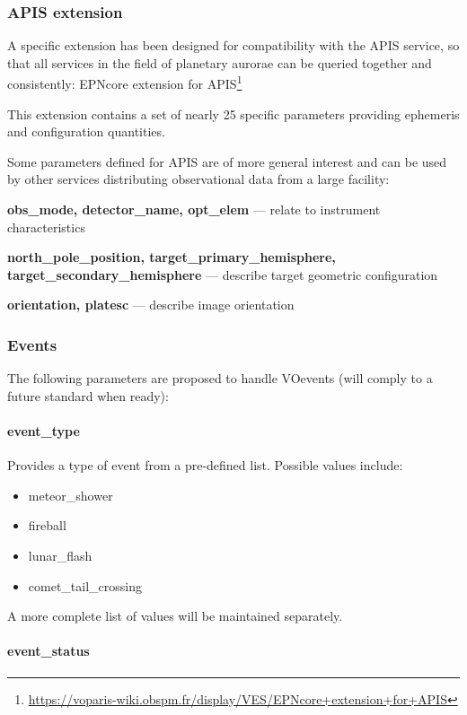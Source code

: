 \documentclass[11pt,a4paper]{ivoa}
\begin{document}
\subsubsection{APIS extension}

A specific extension has been designed for compatibility with the
APIS service, so that all services in the field of planetary aurorae
can be queried together and consistently: EPNcore extension for
APIS\footnote{\url{https://voparis-wiki.obspm.fr/display/VES/EPNcore+extension+for+APIS}}

This extension contains a set of nearly 25 specific parameters 
providing ephemeris and configuration quantities.

Some parameters defined for APIS are of more general interest and can 
be used by other services distributing observational data from a large facility:

\textbf{obs\_mode, detector\_name, opt\_elem } --- relate to instrument
characteristics

\textbf{north\_pole\_position, target\_primary\_hemisphere,
target\_secondary\_hemisphere} --- describe target geometric configuration

\textbf{orientation, platesc} --- describe image orientation

\subsubsection{Events}

The following parameters are proposed to handle VOevents
(will comply to a future standard when ready):

\paragraph{event\_type}

Provides a type of event from a pre-defined list.
Possible values include:

\begin{itemize}
\item meteor\_shower
\item fireball
\item lunar\_flash
\item comet\_tail\_crossing
\end{itemize}

A more complete list of values will be maintained separately.

\paragraph{event\_status}
\end{document}
